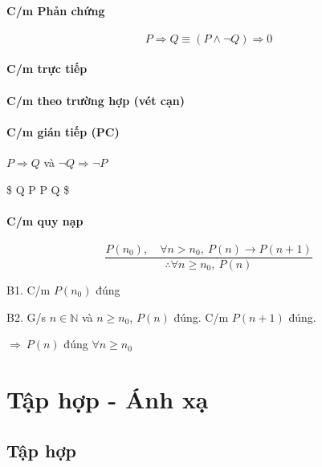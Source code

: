 \documentclass[11pt]{article}
\begin{document}
    \paragraph{C/m Phản chứng}\label{cm-phux1ea3n-chux1ee9ng}

\[
P \Rightarrow Q \equiv (P \land \neg Q) \Rightarrow 0
\]

    \paragraph{C/m trực tiếp}\label{cm-trux1ef1c-tiux1ebfp}

    \paragraph{C/m theo trường hợp (vét
cạn)}\label{cm-theo-trux1b0ux1eddng-hux1ee3p-vuxe9t-cux1ea1n}

    \paragraph{C/m gián tiếp (PC)}\label{cm-giuxe1n-tiux1ebfp-pc}

    \(P \Rightarrow Q\) và \(\neg Q \Rightarrow \neg P\)

\$ \neg Q \Rightarrow \neg P \equiv P \Rightarrow Q \$

    \paragraph{C/m quy nạp}\label{cm-quy-nux1ea1p}

    \[
\frac{P(n_0), \quad \forall n > n_0, \: P(n) \to P(n+1)}{\therefore \forall n \geq n_0, \: P(n)}
\]

    B1. C/m \(P(n_0)\) đúng

B2. G/s \(n \in \mathbb{N}\) và \(n \geq n_0\), \(P(n)\) đúng. C/m
\(P(n+1)\) đúng.

\(\Rightarrow \: P(n)\) đúng \(\forall n \geq n_0\)

    \section{Tập hợp - Ánh xạ}\label{tux1eadp-hux1ee3p---uxe1nh-xux1ea1}

    \subsection{Tập hợp}\label{tux1eadp-hux1ee3p}
\end{document}
